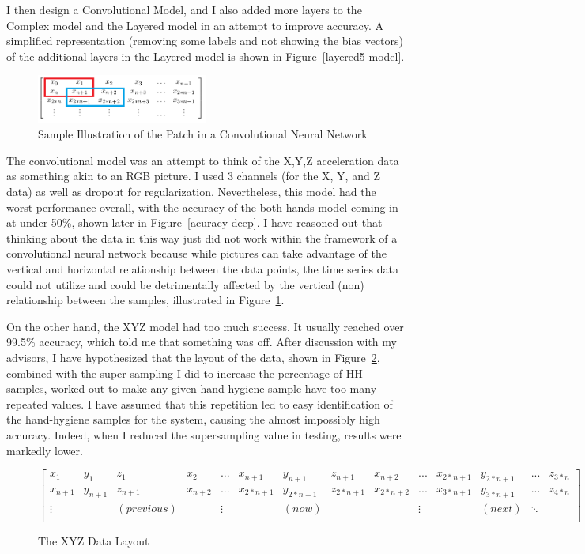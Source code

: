\documentclass[]{report}
\begin{document}
I then design a Convolutional Model, and I also added more layers to the Complex model and the Layered model in an attempt to improve accuracy. A simplified representation (removing some labels and not showing the bias vectors) of the additional layers in the Layered model is shown in Figure~\ref{layered5-model}.

\begin{figure}
	\centering
	\includegraphics[width=0.5\textwidth]{../images/conv-issue}
	\caption{Sample Illustration of the Patch in a Convolutional Neural Network}
	\label{conv-issue}
\end{figure}
The convolutional model was an attempt to think of the X,Y,Z acceleration data as something akin to an RGB picture. I used 3 channels (for the X, Y, and Z data) as well as dropout for regularization. Nevertheless, this model had the worst performance overall, with the accuracy of the both-hands model coming in at under 50\%, shown later in Figure~\ref{acuracy-deep}. I have reasoned out that thinking about the data in this way just did not work within the framework of a convolutional neural network because while pictures can take advantage of the vertical and horizontal relationship between the data points, the time series data could not utilize and could be detrimentally affected by the vertical (non) relationship between the samples, illustrated in Figure~\ref{conv-issue}.

On the other hand, the XYZ model had too much success. It usually reached over 99.5\% accuracy, which told me that something was off. After discussion with my advisors, I have hypothesized that the layout of the data, shown in Figure~\ref{xyz-data}, combined with the super-sampling I did to increase the percentage of HH samples, worked out to make any given hand-hygiene sample have too many repeated values. I have assumed that this repetition led to easy identification of the hand-hygiene samples for the system, causing the almost impossibly high accuracy. Indeed, when I reduced the supersampling value in testing, results were markedly lower.

\begin{figure}
	\centering
	$$
	\left[
	\begin{array}{cccccccccccccc}
	x_{1} & y_{1} & z_{1} & x_{2} & ... & x_{n+1} & y_{n+1} & z_{n+1} & x_{n+2} & ... & x_{2*n+1} & y_{2*n+1} & ... & z_{3*n} \\
	x_{n+1} & y_{n+1} & z_{n+1} & x_{n+2} & ... & x_{2*n+1} & y_{2*n+1} & z_{2*n+1} & x_{2*n+2} & ... & x_{3*n+1} & y_{3*n+1} & ... & z_{4*n} \\
	\vdots & & (previous) & & \vdots & & (now) & &  & \vdots & & (next) & \ddots\\
	\end{array}
	\right]
	$$
	\caption{The XYZ Data Layout}
	\label{xyz-data}
\end{figure}
\end{document}
